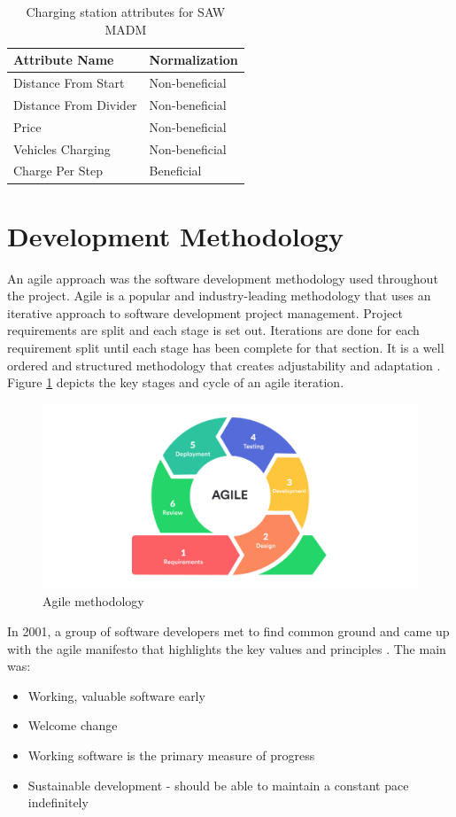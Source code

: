 \documentclass[11pt]{report}
\begin{document}
\begin{table}[h!]
\begin{center}
\begin{tabular}{|p{6cm} p{3cm}|} 
 \hline
 Attribute Name & Normalization \\
 \hline
 Distance From Start & Non-beneficial  \\ 
 Distance From Divider & Non-beneficial  \\ 
 Price & Non-beneficial  \\ 
 Vehicles Charging & Non-beneficial  \\ 
 Charge Per Step & Beneficial  \\ 
 \hline
\end{tabular}
\end{center}
\caption{Charging station attributes for SAW MADM}
\label{table:3}
\end{table}

\section{Development Methodology}

An agile approach was the software development methodology used throughout the project. Agile is a popular and industry-leading methodology that uses an iterative approach to software development project management. Project requirements are split and each stage is set out. Iterations are done for each requirement split until each stage has been complete for that section. It is a well ordered and structured methodology that creates adjustability and adaptation \autocite{InsightstoAgile}. Figure \ref{fig:6} depicts the key stages and cycle of an agile iteration.

\begin{figure}[h!]
  \centering
  \includegraphics[width=0.65\linewidth]{agileWheel.jpg}
  \caption{Agile methodology \autocite{InsightstoAgile}}
  \label{fig:6}
\end{figure}

In 2001, a group of software developers met to find common ground and came up with the agile manifesto that highlights the key values and principles \autocite{beck2001agile}. The main was:
\begin{itemize}
  \item Working, valuable software early
  \item Welcome change
  \item Working software is the primary measure of progress
  \item Sustainable development - should be able to maintain a constant pace indefinitely
\end{itemize}
\end{document}
